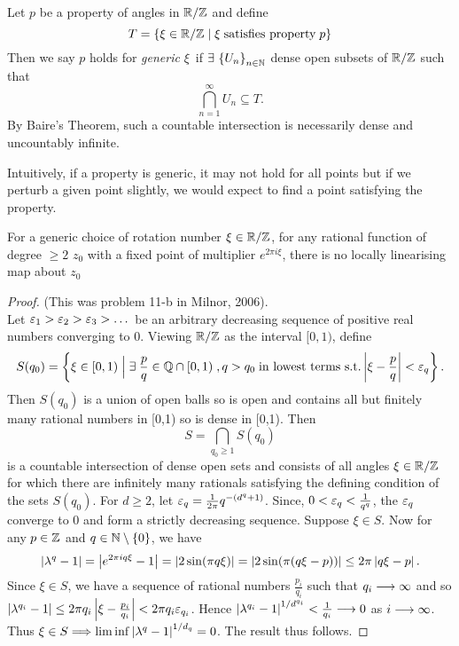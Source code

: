 \documentclass[../main.tex]{subfiles}
\begin{document}
\begin{dfn}
Let $p$ be a property of angles in $\mathbb{R}/\mathbb{Z}$ and define
\[
T = \{\xi \in \mathbb{R}/\mathbb{Z} \mid \xi\; \text{satisfies property}\; p\}
\]
Then we say $p$ holds for \textit{generic} $\xi$\, if $\exists\, \left\{U_{n}\right\}_{n \in \mathbb{N}}$ dense open subsets of $\mathbb{R}/\mathbb{Z}$ such that
\[
\bigcap_{n = 1}^{\infty} U_{n} \subseteq T.
\]
By Baire's Theorem, such a countable intersection is necessarily dense and uncountably infinite.
\end{dfn}

Intuitively, if a property is generic, it may not hold for all points but if we perturb a given point slightly, we would expect to find a point satisfying the property.

\begin{cor}\label{generic}
For a generic choice of rotation number $\xi \in \mathbb{R}/\mathbb{Z}$, for any rational function of degree $\geq 2$ $z_0$ with a fixed point of multiplier $e^{2\pi i \xi}$, there is no locally linearising map about $z_0$ 
\end{cor}
\begin{proof} 
(This was problem 11-b in Milnor, 2006).\\
Let $\varepsilon_{1} > \varepsilon_{2} > \varepsilon_{3} > \dots$ be an arbitrary decreasing sequence of positive real numbers converging to $0$. Viewing $\mathbb{R}/\mathbb{Z}$ as the interval $[0,1)$, define
\[
S(q_{0}) = \left\{\xi \in [0,1) \mathrel{\Big|} \exists\; \frac{p}{q} \in \mathbb{Q} \cap [0,1)\;, q > q_{0}\; \text{in lowest terms s.t.} \left|\xi - \frac{p}{q}\right| < \varepsilon_{q} \right\}.
\]
Then $S(q_{0})$ is a union of open balls so is open and contains all but finitely many rational numbers in [0,1) so is dense in [0,1). Then
\[
S = \bigcap_{q_{0} \geq 1} S(q_{0})
\]
is a countable intersection of dense open sets and consists of all angles $\xi \in \mathbb{R}/\mathbb{Z}$ for which there are infinitely many rationals satisfying the defining condition of the sets $S(q_{0})$. For $d \geq 2$, let $\varepsilon_{q} = \frac{1}{2\pi} q^{-(d^{q}+1)}$. Since, $0 < \varepsilon_{q} < \frac{1}{q^q}$, the $\varepsilon_{q}$ converge to $0$ and form a strictly decreasing sequence. Suppose $\xi \in S$. Now for any $p \in \mathbb{Z}$ and $q \in \mathbb{N}\setminus\{0\}$, we have
\[
\left|\lambda^q - 1\right| = \left|e^{2\pi iq\xi} - 1\right| = \left|2\sin(\pi q\xi)\right| = \left|2\sin(\pi (q\xi - p))\right| \leq 2\pi \left|q\xi - p\right|.
\]
Since $\xi \in S$, we have a sequence of rational numbers $\frac{p_{i}}{q_{i}}$ such that $q_{i} \longrightarrow \infty$ and so $\left|\lambda^{q_{i}} - 1\right| \leq 2\pi q_{i}\left|\xi - \frac{p_{i}}{q_{i}}\right| < 2\pi q_{i} \varepsilon_{q_{i}}$. Hence $\left|\lambda^{q_{i}} - 1\right|^{1/d^{q_{i}}} < \frac{1}{q_{i}} \longrightarrow 0$ as $i \longrightarrow \infty$. Thus $\xi \in S \Longrightarrow \liminf{\ensuremath{\left|\lambda^q - 1\right|}^{1/d_{q}}} = 0$. The result thus follows.
\end{proof}
\end{document}
